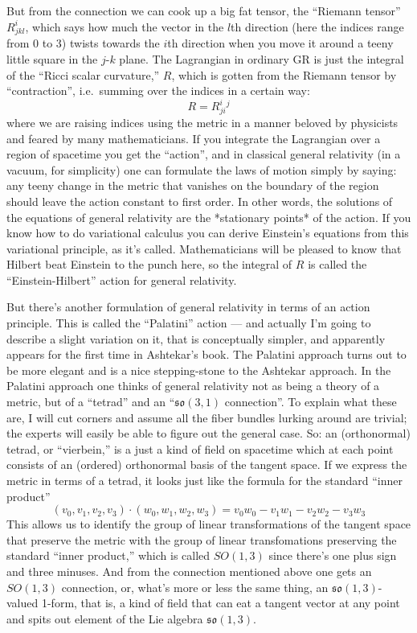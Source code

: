 \documentclass{article}
\begin{document}
But from the connection we can cook up a big fat tensor, the ``Riemann
tensor'' \(R^i_{jkl}\), which says how much the vector in the \(l\)th
direction (here the indices range from 0 to 3) twists towards the
\(i\)th direction when you move it around a teeny little square in the
\(j\)-\(k\) plane. The Lagrangian in ordinary GR is just the integral of
the ``Ricci scalar curvature,'' \(R\), which is gotten from the Riemann
tensor by ``contraction'', i.e.~summing over the indices in a certain
way: \[R = R^i_{ji}{}^j\] where we are raising indices using the metric
in a manner beloved by physicists and feared by many mathematicians. If
you integrate the Lagrangian over a region of spacetime you get the
``action'', and in classical general relativity (in a vacuum, for
simplicity) one can formulate the laws of motion simply by saying: any
teeny change in the metric that vanishes on the boundary of the region
should leave the action constant to first order. In other words, the
solutions of the equations of general relativity are the *stationary
points* of the action. If you know how to do variational calculus you
can derive Einstein's equations from this variational principle, as it's
called. Mathematicians will be pleased to know that Hilbert beat
Einstein to the punch here, so the integral of \(R\) is called the
``Einstein-Hilbert'' action for general relativity.

But there's another formulation of general relativity in terms of an
action principle. This is called the ``Palatini'' action --- and
actually I'm going to describe a slight variation on it, that is
conceptually simpler, and apparently appears for the first time in
Ashtekar's book. The Palatini approach turns out to be more elegant and
is a nice stepping-stone to the Ashtekar approach. In the Palatini
approach one thinks of general relativity not as being a theory of a
metric, but of a ``tetrad'' and an ``\(\mathfrak{so}(3,1)\)
connection''. To explain what these are, I will cut corners and assume
all the fiber bundles lurking around are trivial; the experts will
easily be able to figure out the general case. So: an (orthonormal)
tetrad, or ``vierbein,'' is a just a kind of field on spacetime which at
each point consists of an (ordered) orthonormal basis of the tangent
space. If we express the metric in terms of a tetrad, it looks just like
the formula for the standard ``inner product''
\[(v_0,v_1,v_2,v_3)\cdot(w_0,w_1,w_2,w_3) = v_0w_0 -v_1w_1 -v_2w_2 -v_3w_3\]
This allows us to identify the group of linear transformations of the
tangent space that preserve the metric with the group of linear
transfomations preserving the standard ``inner product,'' which is
called \(SO(1,3)\) since there's one plus sign and three minuses. And
from the connection mentioned above one gets an \(SO(1,3)\) connection,
or, what's more or less the same thing, an \(\mathfrak{so}(1,3)\)-valued
1-form, that is, a kind of field that can eat a tangent vector at any
point and spits out element of the Lie algebra \(\mathfrak{so}(1,3)\).
\end{document}
